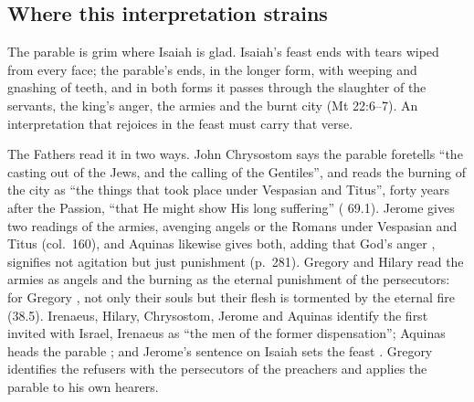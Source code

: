 \subsection{Where this interpretation strains}

The parable is grim where Isaiah is glad. Isaiah's feast ends with tears wiped
from every face; the parable's ends, in the longer form, with weeping and
gnashing of teeth, and in both forms it passes through the slaughter of the
servants, the king's anger, the armies and the burnt city (Mt 22:6--7). An
interpretation that rejoices in the feast must carry that verse.

The Fathers read it in two ways. John Chrysostom says the parable foretells
``the casting out of the Jews, and the calling of the Gentiles'', and reads the
burning of the city as ``the things that took place under Vespasian and
Titus'', forty years after the Passion, ``that He might show His long
suffering'' ( 69.1). Jerome gives two readings of the
armies, avenging angels or the Romans under Vespasian and Titus (col.~160), and
Aquinas likewise gives both, adding that God's anger , signifies not agitation but just punishment
(p.~281). Gregory and Hilary read the armies as angels and the burning as the
eternal punishment of the persecutors: for Gregory , not only their
souls but their flesh is tormented by the eternal fire (38.5). Irenaeus,
Hilary, Chrysostom, Jerome and Aquinas identify the first invited with Israel,
Irenaeus as ``the men of the former dispensation''; Aquinas heads the parable
; and Jerome's sentence on
Isaiah sets the feast . Gregory identifies
the refusers with the persecutors of the preachers and applies the parable to
his own hearers.

